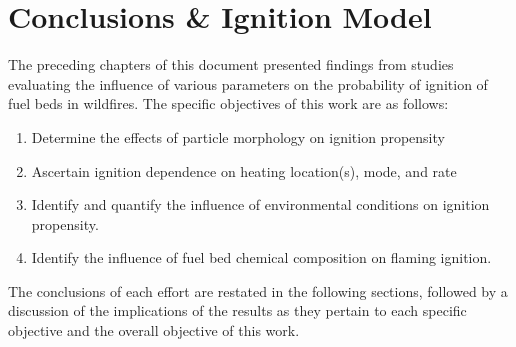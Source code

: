 
\chapter{Conclusions \& Ignition Model}
\label{chap:conclusion}
The preceding chapters of this document presented findings from studies evaluating the influence of various parameters on the probability of ignition of fuel beds in wildfires. The specific objectives of this work are as follows:
        \begin{enumerate}
            \item Determine the effects of particle morphology on ignition propensity
            \item Ascertain ignition dependence on heating location(s), mode, and rate
            \item Identify and quantify the influence of environmental conditions on ignition propensity.
            \item Identify the influence of fuel bed chemical composition on flaming ignition.
        \end{enumerate}
The conclusions of each effort are restated in the following sections, followed by a discussion of the implications of the results as they pertain to each specific objective and the overall objective of this work.

